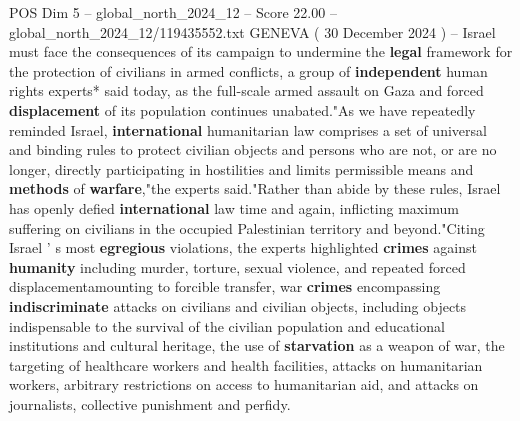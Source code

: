 \begin{textsample}{POS Dim 5 – global\_north\_2024\_12 – Score 22.00 – global\_north\_2024\_12/119435552.txt}  \label{ex:f5_pos_091}
GENEVA ( 30 December 2024 ) -- Israel must face the consequences of its campaign to undermine the \textbf{legal} framework for the protection of civilians in armed conflicts, a group of \textbf{independent} human rights experts* said today, as the full-scale armed assault on Gaza and forced \textbf{displacement} of its population continues unabated."As we have repeatedly reminded Israel, \textbf{international} humanitarian law comprises a set of universal and binding rules to protect civilian objects and persons who are not, or are no longer, directly participating in hostilities and limits permissible means and \textbf{methods} of \textbf{warfare},"the experts said."Rather than abide by these rules, Israel has openly defied \textbf{international} law time and again, inflicting maximum suffering on civilians in the occupied Palestinian territory and beyond."Citing Israel ' s most \textbf{egregious} violations, the experts highlighted \textbf{crimes} against \textbf{humanity} including murder, torture, sexual violence, and repeated forced displacementamounting to forcible transfer, war \textbf{crimes} encompassing \textbf{indiscriminate} attacks on civilians and civilian objects, including objects indispensable to the survival of the civilian population and educational institutions and cultural heritage, the use of \textbf{starvation} as a weapon of war, the targeting of healthcare workers and health facilities, attacks on humanitarian workers, arbitrary restrictions on access to humanitarian aid, and attacks on journalists, collective punishment and perfidy.

\end{textsample}
